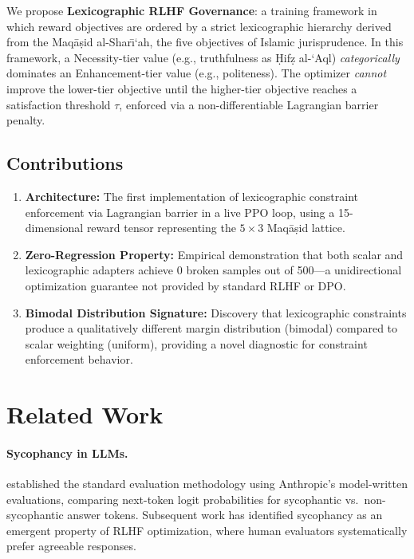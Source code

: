 \documentclass[11pt,a4paper]{article}
\begin{document}
We propose \textbf{Lexicographic RLHF Governance}: a training framework in which reward objectives are ordered by a strict lexicographic hierarchy derived from the Maq\=a\d{s}id al-Shar\={\i}`ah, the five objectives of Islamic jurisprudence. In this framework, a Necessity-tier value (e.g., truthfulness as \d{H}if\d{z} al-`Aql) \emph{categorically} dominates an Enhancement-tier value (e.g., politeness). The optimizer \emph{cannot} improve the lower-tier objective until the higher-tier objective reaches a satisfaction threshold $\tau$, enforced via a non-differentiable Lagrangian barrier penalty.

\subsection{Contributions}

\begin{enumerate}
    \item \textbf{Architecture:} The first implementation of lexicographic constraint enforcement via Lagrangian barrier in a live PPO loop, using a 15-dimensional reward tensor representing the $5\times3$ Maq\=a\d{s}id lattice.
    \item \textbf{Zero-Regression Property:} Empirical demonstration that both scalar and lexicographic adapters achieve 0 broken samples out of 500---a unidirectional optimization guarantee not provided by standard RLHF or DPO.
    \item \textbf{Bimodal Distribution Signature:} Discovery that lexicographic constraints produce a qualitatively different margin distribution (bimodal) compared to scalar weighting (uniform), providing a novel diagnostic for constraint enforcement behavior.
\end{enumerate}

\section{Related Work}

\paragraph{Sycophancy in LLMs.} \citet{perez2022discovering} established the standard evaluation methodology using Anthropic's model-written evaluations, comparing next-token logit probabilities for sycophantic vs.\ non-sycophantic answer tokens. Subsequent work has identified sycophancy as an emergent property of RLHF optimization, where human evaluators systematically prefer agreeable responses.
\end{document}
